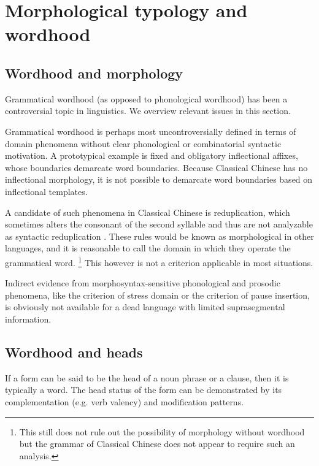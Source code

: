 \documentclass[UTF8, a4paper, oneside, scheme=plain, 12pt]{ctexrep}
\newcommand*{\citepages}[1]{pp.~{#1}}
\begin{document}
\section{Morphological typology and wordhood}\label{sec:grammatical.morphology}

\subsection{Wordhood and morphology}\label{sec:grammatical.morphology.template}

Grammatical wordhood (as opposed to phonological wordhood) has been a controversial topic in linguistics.
We overview relevant issues in this section.

Grammatical wordhood is perhaps most uncontroversially defined in terms of domain phenomena without clear phonological or combinatorial syntactic motivation.
A prototypical example is fixed and obligatory inflectional affixes, whose boundaries demarcate word boundaries. 
Because Classical Chinese has no inflectional morphology,
it is not possible to demarcate word boundaries based on inflectional templates.

A candidate of such phenomena in Classical Chinese is reduplication,
which sometimes alters the consonant of the second syllable 
and thus are not analyzable as syntactic reduplication \citep{travis2001syntax}.
These rules would be known as morphological in other languages,
and it is reasonable to call the domain in which they operate the grammatical word.%
\footnote{
    This still does not rule out the possibility of morphology without wordhood
    but the grammar of Classical Chinese does not appear to require such an analysis.
}
This however is not a criterion applicable in most situations.

Indirect evidence from morphosyntax-sensitive phonological and prosodic phenomena, 
like the criterion of stress domain \citep[\citepages{41-42}]{zhudexigrammar} or the criterion of pause insertion,
is obviously not available for a dead language with limited suprasegmental information.

\subsection{Wordhood and heads}\label{sec:grammatical.morphology.lexicalization}

If a form can be said to be the head of a noun phrase or a clause, then it is typically a word.
The head status of the form can be demonstrated by its complementation (e.g. verb valency) and modification patterns.
\end{document}
